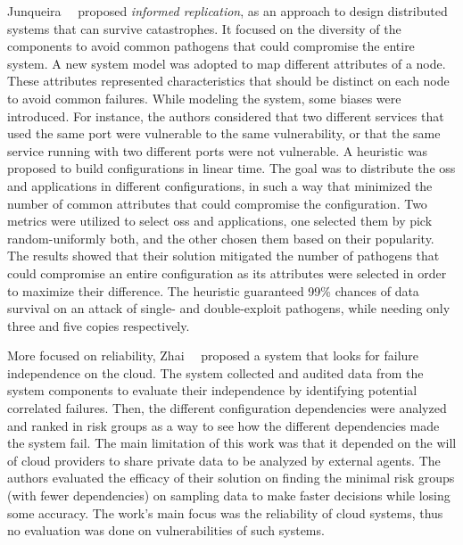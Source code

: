 Junqueira~\etal{}~\cite{Junqueira:2005} proposed \emph{informed replication}, as an approach to design distributed systems that can survive catastrophes.
It focused on the diversity of the components to avoid common pathogens that could compromise the entire system.
A new system model was adopted to map different attributes of a node. 
These attributes represented characteristics that should be distinct on each node to avoid common failures.
While modeling the system, some biases were introduced.
For instance, the authors considered that two different services that used the same port were vulnerable to the same vulnerability, or that the same service running with two different ports were not vulnerable.
A heuristic was proposed to build configurations in linear time.
The goal was to distribute the \glspl{os} and applications in different configurations, in such a way that minimized the number of common attributes that could compromise the configuration.
Two metrics were utilized to select \glspl{os} and applications, one selected them by pick random-uniformly both, and the other chosen them based on their popularity.
The results showed that their solution mitigated the number of pathogens that could compromise an entire configuration as its attributes were selected in order to maximize their difference.
The heuristic guaranteed 99\% chances of data survival on an attack of single- and double-exploit pathogens, while needing only three and five copies respectively.


More focused on reliability, Zhai~\etal{}~\cite{Zhai:2014} proposed a system that looks for failure independence on the cloud.
The system collected and audited data from the system components to evaluate their independence by identifying potential correlated failures.
Then, the different configuration dependencies were analyzed and ranked in risk groups as a way to see how the different dependencies made the system fail.
The main limitation of this work was that it depended on the will of cloud providers to share private data to be analyzed by external agents.
The authors evaluated the efficacy of their solution on finding the minimal risk groups (with fewer dependencies) on sampling data to make faster decisions while losing some accuracy.
The work's main focus was the reliability of cloud systems, thus no evaluation was done on vulnerabilities of such systems.

